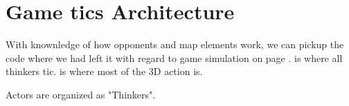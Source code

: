 \pagebreak
{}
\par
{}

\pagebreak
\section{Game tics Architecture}
With knownledge of how opponents and map elements work, we can pickup the code where we had left it with regard to game simulation on page \pageref{TryRunTics.c}.  is where all thinkers tic.  is where most of the 3D action is.\\
\par
{}
\par
Actors are organized as "Thinkers".\\
\par
{}
